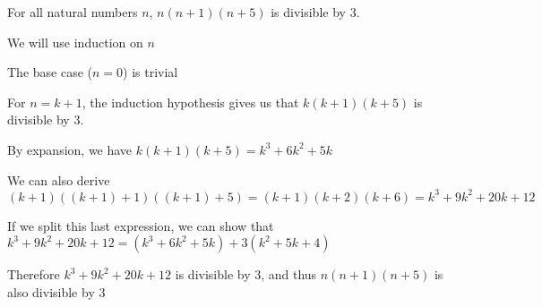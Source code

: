 
For all natural numbers $n$, $n(n+1)(n+5)$ is divisible by $3$.

We will use induction on $n$

The base case ($n=0$) is trivial

For $n=k+1$, the induction hypothesis gives us that $k(k+1)(k+5)$ is divisible by $3$.

By expansion, we have $k(k+1)(k+5) = k^3 + 6k^2 + 5k$

We can also derive $(k+1)((k+1)+1)((k+1)+5) = (k+1)(k+2)(k+6) = k^3 + 9k^2 + 20k + 12$

If we split this last expression, we can show that $k^3 + 9k^2 + 20k + 12 = (k^3 + 6k^2 + 5k) + 3(k^2 + 5k + 4)$

Therefore $k^3 + 9k^2 + 20k + 12$ is divisible by $3$, and thus $n(n+1)(n+5)$ is also divisible by $3$

